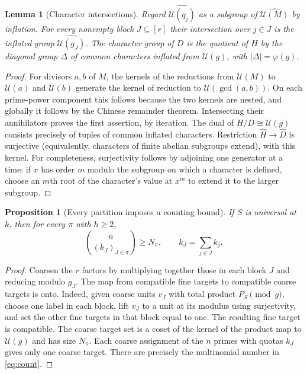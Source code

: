 \documentclass[11pt]{article}
\newtheorem{lemma}[theorem]{Lemma}
\newtheorem{proposition}[theorem]{Proposition}
\theoremstyle{definition}\newtheorem{remark}[theorem]{Remark}
\newcommand{\G}{\mathcal U}
\begin{document}
\begin{lemma}[Character intersections]\label{lem:intersection}
Regard $\widehat{\G(q_j)}$ as a subgroup of $\widehat{\G(M)}$ by inflation. For every nonempty block $J\subseteq[r]$ their intersection over $j\in J$ is the inflated group $\widehat{\G(g_J)}$. The character group of $D$ is the quotient of $\widehat H$ by the diagonal group $\Delta$ of common characters inflated from $\G(g)$, with $|\Delta|=\varphi(g)$.
\end{lemma}
\begin{proof}
For divisors $a,b$ of $M$, the kernels of the reductions from $\G(M)$ to $\G(a)$ and $\G(b)$ generate the kernel of reduction to $\G(\gcd(a,b))$. On each prime-power component this follows because the two kernels are nested, and globally it follows by the Chinese remainder theorem. Intersecting their annihilators proves the first assertion, by iteration. The dual of $H/D\cong\G(g)$ consists precisely of tuples of common inflated characters. Restriction $\widehat H\to\widehat D$ is surjective (equivalently, characters of finite abelian subgroups extend), with this kernel. For completeness, surjectivity follows by adjoining one generator at a time: if $x$ has order $m$ modulo the subgroup on which a character is defined, choose an $m$th root of the character's value at $x^m$ to extend it to the larger subgroup.
\end{proof}

\begin{proposition}[Every partition imposes a counting bound]\label{prop:count}
If $S$ is universal at $k$, then for every $\pi$ with $h\ge2$,
\begin{equation}\label{eq:count}
 \binom{n}{(k_J)_{J\in\pi}}\ge N_\pi,\qquad k_J=\sum_{j\in J}k_j.
\end{equation}
\end{proposition}
\begin{proof}
Coarsen the $r$ factors by multiplying together those in each block $J$ and reducing modulo $g_J$. The map from compatible fine targets to compatible coarse targets is onto. Indeed, given coarse units $v_J$ with total product $P_S\pmod g$, choose one label in each block, lift $v_J$ to a unit at its modulus using surjectivity, and set the other fine targets in that block equal to one. The resulting fine target is compatible. The coarse target set is a coset of the kernel of the product map to $\G(g)$ and has size $N_\pi$. Each coarse assignment of the $n$ primes with quotas $k_J$ gives only one coarse target. There are precisely the multinomial number in \eqref{eq:count}.
\end{proof}
\end{document}
